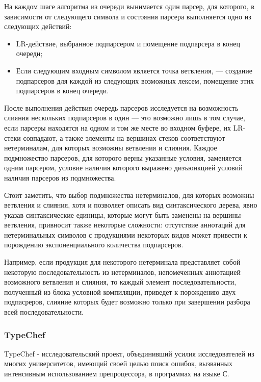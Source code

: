 На каждом шаге алгоритма из очереди вынимается один парсер, для которого, в зависимости от следующего символа и состояния парсера выполняется одно из следующих действий:

\begin{itemize}
\item LR-действие, выбранное подпарсером и помещение подпарсера в конец очереди;
\item Если следующим входным символом является точка ветвления, --- создание подпарсеров для каждой из следующих возможных лексем, помещение этих подпарсеров в конец очереди.
\end{itemize}

После выполнения действия очередь парсеров исследуется на возможность слияния нескольких подпарсеров в один --- это возможно лишь в том случае, если парсеры находятся на одном и том же месте во входном буфере, их LR-стеки совпадают, а также элементы на вершинах стеков соответствуют нетерминалам, для которых возможны ветвления и слияния. Каждое подмножество парсеров, для которого верны указанные условия, заменяется одним парсером, условие наличия которого выражено дизъюнкцией условий наличия парсеров из подмножества.

Стоит заметить, что выбор подмножества нетерминалов, для которых возможны ветвления и слияния, хотя и позволяет описать вид синтаксического дерева, явно указав синтаксические единицы, которые могут быть заменены на вершины-ветвления, привносит также некоторые сложности: отсутствие аннотаций для нетерминальных символов с продукциями некоторых видов может привести к порождению экспоненциального количества подпарсеров. 

Например, если продукция для некоторого нетерминала представляет собой некоторую последовательность из нетерминалов, непомеченных аннотацией возможного ветвления и слияния, то каждый элемент последовательности, полученный из блока условной компиляции, приведет к порождению двух подпасреров, слияние которых будет возможно только при завершении разбора всей последовательности. 

\subsubsection{TypeChef}

TypeChef - исследовательский проект, объединивший усилия исследователей из многих университетов, имеющий своей целью поиск ошибок, вызванных интенсивным использованием препроцессора, в программах на языке С.

